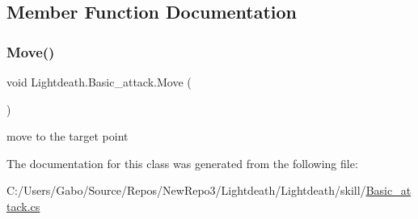 \subsection{Member Function Documentation}
\hypertarget{class_lightdeath_1_1_basic__attack_a36c0c41a008f1a0118d60a042801e073}{}\label{class_lightdeath_1_1_basic__attack_a36c0c41a008f1a0118d60a042801e073} 
\subsubsection{\texorpdfstring{Move()}{Move()}}
{\footnotesize\ttfamily void Lightdeath.\+Basic\+\_\+attack.\+Move (\begin{DoxyParamCaption}{ }\end{DoxyParamCaption})\hspace{0.3cm}{\ttfamily [inline]}}



move to the target point 



The documentation for this class was generated from the following file\+:\begin{DoxyCompactItemize}
\item 
C\+:/\+Users/\+Gabo/\+Source/\+Repos/\+New\+Repo3/\+Lightdeath/\+Lightdeath/skill/\hyperlink{_basic__attack_8cs}{Basic\+\_\+attack.\+cs}\end{DoxyCompactItemize}
